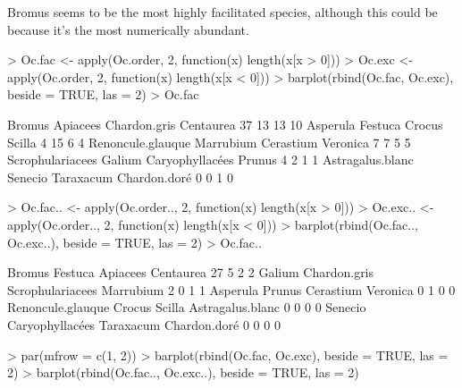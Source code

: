\documentclass[12pt]{article}
\begin{document}
Bromus seems to be the most highly facilitated species, although this
could be because it's the most numerically abundant.

\begin{Schunk}
\begin{Sinput}
> Oc.fac <- apply(Oc.order, 2, function(x) length(x[x > 0]))
> Oc.exc <- apply(Oc.order, 2, function(x) length(x[x < 0]))
> barplot(rbind(Oc.fac, Oc.exc), beside = TRUE, las = 2)
> Oc.fac
\end{Sinput}
\begin{Soutput}
           Bromus          Apiacees      Chardon.gris         Centaurea 
               37                13                13                10 
         Asperula           Festuca            Crocus            Scilla 
                4                15                 6                 4 
Renoncule.glauque         Marrubium         Cerastium          Veronica 
                7                 7                 5                 5 
 Scrophulariacees            Galium   Caryophyllacées            Prunus 
                4                 2                 1                 1 
 Astragalus.blanc           Senecio         Taraxacum      Chardon.doré 
                0                 0                 1                 0 
\end{Soutput}
\begin{Sinput}
> Oc.fac.. <- apply(Oc.order.., 2, function(x) length(x[x > 0]))
> Oc.exc.. <- apply(Oc.order.., 2, function(x) length(x[x < 0]))
> barplot(rbind(Oc.fac.., Oc.exc..), beside = TRUE, las = 2)
> Oc.fac..
\end{Sinput}
\begin{Soutput}
           Bromus           Festuca          Apiacees         Centaurea 
               27                 5                 2                 2 
           Galium      Chardon.gris  Scrophulariacees         Marrubium 
                2                 0                 1                 1 
         Asperula            Prunus         Cerastium          Veronica 
                0                 1                 0                 0 
Renoncule.glauque            Crocus            Scilla  Astragalus.blanc 
                0                 0                 0                 0 
          Senecio   Caryophyllacées         Taraxacum      Chardon.doré 
                0                 0                 0                 0 
\end{Soutput}
\begin{Sinput}
> par(mfrow = c(1, 2))
> barplot(rbind(Oc.fac, Oc.exc), beside = TRUE, las = 2)
> barplot(rbind(Oc.fac.., Oc.exc..), beside = TRUE, las = 2)
\end{Sinput}
\end{Schunk}
\end{document}
